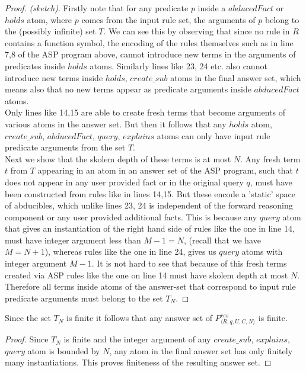 \begin{proof}\textit{(sketch)}. Firstly note that for any predicate $p$ inside a
$abducedFact$ or $holds$ atom, where $p$ comes from the input rule set, the
arguments of $p$ belong to the (possibly infinite) set $T$. We can see this by observing that
since no rule in $R$ contains a function symbol, the encoding of the rules
themselves such as in line 7,8 of the ASP program above, cannot introduce new
terms in the arguments of predicates inside $holds$ atoms. Similarly lines
like 23, 24 etc. also cannot introduce new terms inside $holds$, $create\_sub$
atoms in the final answer set, which means also that no new terms appear as
predicate arguments inside $abducedFact$ atoms.\\ 
Only lines like 14,15 are able to create fresh terms that become arguments of
various atoms in the answer set. But then it follows that any $holds$ atom,
$create\_sub$, $abducedFact$, $query$, $explains$ atoms can only have input rule predicate arguments from the set $T$.\\
Next we show that the skolem depth of these terms is at most $N$. Any fresh
term $t$ from $T$ appearing in an atom in an answer set of the ASP program, such that $t$ does not appear in any user provided fact or in the original query $q$, must have been constructed from rules like in lines 14,15. But these encode a 'static' space of
abducibles, which unlike lines 23, 24 is independent of the forward reasoning
component or any user provided additional facts. This is because any $query$ atom that gives an instantiation of the right hand side of rules like the one in line 14, must have integer argument less than $M-1=N$, (recall that we have $M=N+1$), whereas rules like the one in line 24, gives us $query$ atoms with integer argument $M-1$. It is not hard to see that because of this fresh terms created via ASP rules like the one on line 14 must have skolem depth at most $N$. Therefore all terms inside atoms of the answer-set that correspond to input rule predicate arguments must belong to the set $T_{N}$.  
\end{proof}

\begin{lemma}
Since the set $T_{N}$ is finite it follows that any answer set of $P_{\langle
  R,q,U,C,N \rangle}^{res}$ is finite.
\end{lemma}

\begin{proof}
Since $T_{N}$ is finite and the integer argument of any $create\_sub$, $explains$, $query$ 
atom is bounded by $N$, any atom in the final answer set has only finitely
many instantiations. This proves finiteness of the resulting answer set.
\end{proof}

